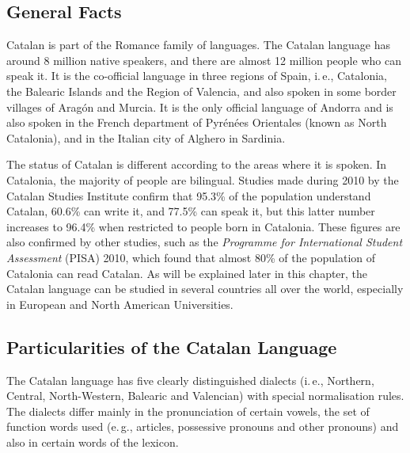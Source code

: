 \clearpage


\begin{multicols}{2}

\subsection{General Facts}

    Catalan is part of the Romance family of languages. The Catalan language has around 8 million native speakers, and there are almost 12 million people who can speak it. It is the co-official language in three regions of Spain, i.\,e., Catalonia, the Balearic Islands and the Region of Valencia, and also spoken in some border villages of Aragón and Murcia.  It is the only official language of Andorra and is also spoken in the French department of Pyrénées Orientales (known as North Catalonia), and in the Italian city of Alghero in Sardinia.


The status of Catalan is different according to the areas where it is spoken. In Catalonia, the majority of people are bilingual. Studies made during 2010 by the Catalan Studies Institute confirm that 95.3\% of the population understand Catalan, 60.6\% can write it, and 77.5\% can speak it, but this latter number increases to 96.4\% when restricted to people born in Catalonia. These figures are also confirmed by other studies, such as the \textit{Programme for International Student Assessment} (PISA)  2010, which found that almost 80\% of the population of Catalonia can read Catalan. 
As will be explained later in this chapter, the Catalan language can be studied in several countries all over the world, especially in European and North American Universities.


\subsection{Particularities of the Catalan Language}

The Catalan language has five clearly distinguished dialects (i.\,e., Northern, Central, North-Western, Balearic and Valencian) with special normalisation rules. The dialects differ mainly in the pronunciation of certain vowels, the set of function words used (e.\,g., articles, possessive pronouns and other pronouns) and also in certain words of the lexicon. 


\end{multicols}

